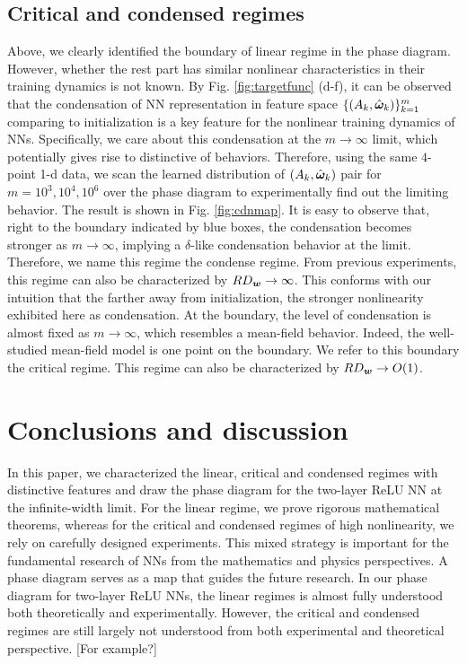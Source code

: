 \documentclass{article}
\begin{document}
\subsection{Critical and condensed regimes}
Above, we clearly identified the boundary of linear regime in the phase diagram. However, whether the rest part has similar nonlinear characteristics in their training dynamics is not known. By Fig. \ref{fig:targetfunc} (d-f), it can be observed that the condensation of NN representation in feature space $\{(A_k,\hat{\bm{\omega}}_k)\}_{k=1}^m$ comparing to initialization is a key feature for the nonlinear training dynamics of NNs. Specifically, we care about this condensation at the $m\to\infty$ limit, which potentially gives rise to distinctive of behaviors. Therefore, using the same $4$-point 1-d data, we scan the learned distribution of $(A_k,\hat{\bm{\omega}}_k)$ pair for $m=10^3,10^4,10^6$ over the phase diagram to experimentally find out the limiting behavior. The result is shown in Fig. \ref{fig:cdnmap}. It is easy to observe that, right to the boundary indicated by blue boxes, the condensation becomes stronger as $m\to\infty$, implying a $\delta$-like condensation behavior at the limit. Therefore, we name this regime the condense regime. From previous experiments, this regime can also be characterized by $RD_{\bm{w}}\to \infty$. This conforms with our intuition that the farther away from initialization, the stronger nonlinearity exhibited here as condensation. At the boundary, the level of condensation is almost fixed as $m\to\infty$, which resembles a mean-field behavior. Indeed, the well-studied mean-field model is one point on the boundary. We refer to this boundary the critical regime. This regime can also be characterized by $RD_{\bm{w}}\to O(1)$. 

\section{Conclusions and discussion}

In this paper, we characterized the linear, critical and condensed regimes with distinctive features and draw the phase diagram for the two-layer ReLU NN at the infinite-width limit. For the linear regime, we prove rigorous mathematical theorems, whereas for the critical and condensed regimes of high nonlinearity, we rely on carefully designed experiments. This mixed strategy is important for the fundamental research of NNs from the mathematics and physics perspectives. 
A phase diagram serves as a map that guides the future research. In our phase diagram for two-layer ReLU NNs, the linear regimes is almost fully understood both theoretically and experimentally. However, the critical and condensed regimes are still largely not understood from both experimental and theoretical perspective. [For example?]
\end{document}
